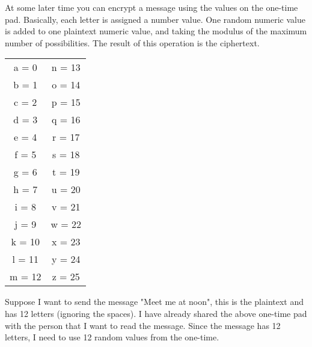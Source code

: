At some later time you can encrypt a message using the values on the one-time pad. Basically, each letter is assigned a number value. One random numeric value is added to one plaintext numeric value, and taking the modulus of the maximum number of possibilities. The result of this operation is the ciphertext.\\


\begin{center}
	
	\begin{tabular}{c | c }
		
		a = 0 & n = 13 \\
		b = 1 & o = 14 \\
		c = 2 & p = 15 \\
		d = 3 & q = 16 \\
		e = 4 & r = 17 \\
		f = 5 & s = 18 \\
		g = 6 & t = 19 \\
		h = 7 & u = 20 \\
		i = 8 & v = 21 \\
		j = 9 & w = 22 \\
		k = 10 & x = 23 \\
		l = 11 & y = 24 \\
		m = 12 & z = 25 \\
	\end{tabular}
\end{center}

Suppose I want to send the message "Meet me at noon", this is the plaintext and has 12 letters (ignoring the spaces). I have already shared the above one-time pad with the person that I want to read the message. Since the message has 12 letters, I need to use 12 random values from the one-time.\\